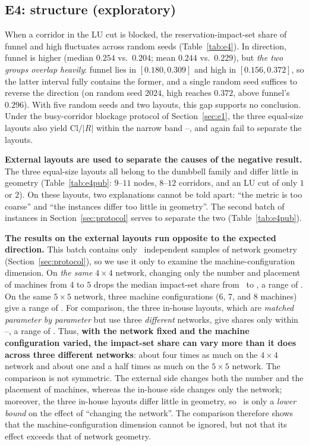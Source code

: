 \subsection{E4: structure (exploratory)}
\label{sec:e4}

When a corridor in the LU cut is blocked, the reservation-impact-set share of funnel and high fluctuates across random seeds (Table~\ref{tab:e4}).
In direction, funnel is higher (median \(0.254\) vs.\ \(0.204\); mean \(0.244\) vs.\ \(0.229\)),
but \emph{the two groups overlap heavily}: funnel lies in \([0.180,0.309]\) and high in
\([0.156,0.372]\), so the latter interval fully contains the former, and a single random seed suffices to reverse the direction
(on random seed \(2024\), high reaches \(0.372\), above funnel's \(0.296\)).
With five random seeds and two layouts, this gap supports no conclusion.
Under the busy-corridor blockage protocol of Section~\ref{sec:e1}, the three equal-size layouts also yield
\(\mathrm{Cl}/|R|\) within the narrow band \EoneCloLo--\EoneCloHi, and again fail to separate the layouts.

\textbf{External layouts are used to separate the causes of the negative result.}
The three equal-size layouts all belong to the dumbbell family and differ little in geometry (Table~\ref{tab:e4pub}: \(9\)--\(11\) nodes,
\(8\)--\(12\) corridors, and an LU cut of only \(1\) or \(2\)). On these layouts, two explanations cannot be told apart: ``the metric is too coarse''
and ``the instances differ too little in geometry''. The second batch of instances in Section~\ref{sec:protocol}
serves to separate the two (Table~\ref{tab:e4pub}).

\textbf{The results on the external layouts run opposite to the expected direction.}
This batch contains only \NPubNets\ independent samples of network geometry (Section~\ref{sec:protocol}), so we use it only to examine the machine-configuration dimension.
On \emph{the same} \(4\times 4\) network, changing only the number and placement of machines from \(4\) to \(5\)
drops the median impact-set share from \PubCloHi\ to \PubCloLo, a range of \PubCloSpread.
On the same \(5\times 5\) network, three machine configurations (\(6\), \(7\), and \(8\) machines) give a range of \PubCloSpreadBig.
For comparison, the three in-house layouts, which are \emph{matched parameter by parameter} but use three \emph{different} networks,
give shares only within \SelfCloLo--\SelfCloHi, a range of \SelfCloSpread.
Thus, \textbf{with the network fixed and the machine configuration varied, the impact-set share can vary more than it does across three different networks}:
about four times as much on the \(4\times 4\) network and about one and a half times as much on the \(5\times 5\) network.
The comparison is not symmetric. The external side changes both the number and the placement of machines, whereas the in-house side changes only the network; moreover, the three in-house layouts differ little in geometry,
so \SelfCloSpread\ is only a \emph{lower bound} on the effect of ``changing the network''. The comparison therefore shows that the machine-configuration dimension cannot be ignored,
but not that its effect exceeds that of network geometry.

